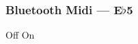 \subsubsection{Bluetooth Midi --- \UiKey{\SET}E$\flat$5}









































Off
On

